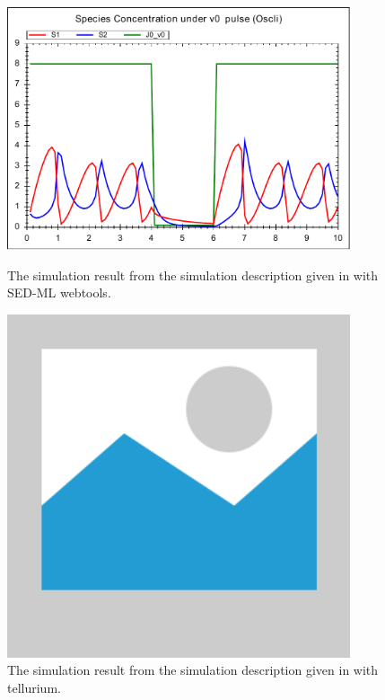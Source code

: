\begin{figure}[ht]
    \centering
    \begin{minipage}{0.45\textwidth}
        \centering
        \includegraphics[width=0.9\textwidth]{examples/oscli-nested-pulse/results/oscli-nested-pulse}
        \caption{The simulation result from the simulation description given in  with SED-ML webtools.}
    \end{minipage}\hfill
    \begin{minipage}{0.45\textwidth}
        \centering
        \includegraphics[width=0.9\textwidth]{examples/placeholder}
        \caption{The simulation result from the simulation description given in  with tellurium.}
    \end{minipage}
    \label{fig:oscli-nested-pulse}
\end{figure}


